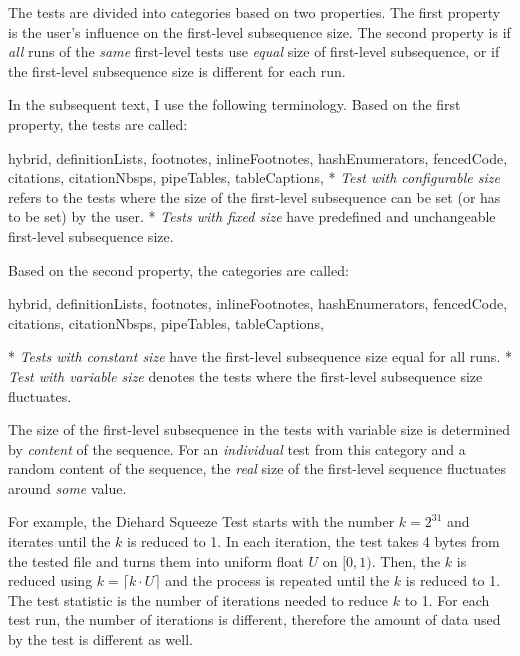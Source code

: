 \documentclass[
  digital,     %
  oneside,     %
  nosansbold,  %
  nocolorbold, %
  nolof,         %
  nolot,         %
]{fithesis4}
\begin{document}
The tests are divided into categories based on two properties. The first property is the user's influence on the first-level subsequence size. The second property is if \emph{all} runs of the \emph{same} first-level tests use \emph{equal} size of first-level subsequence, or if the first-level subsequence size is different for each run. 

In the subsequent text, I use the following terminology. Based on the first property, the tests are called:
\begin{markdown*}{%
  hybrid,
  definitionLists,
  footnotes,
  inlineFootnotes,
  hashEnumerators,
  fencedCode,
  citations,
  citationNbsps,
  pipeTables,
  tableCaptions,
}
* \emph{Test with configurable size} refers to the tests where the size of the first-level subsequence can be set (or has to be set) by the user.
* \emph{Tests with fixed size} have predefined and unchangeable first-level subsequence size.
\end{markdown*}
Based on the second property, the categories are called:
\begin{markdown*}{%
  hybrid,
  definitionLists,
  footnotes,
  inlineFootnotes,
  hashEnumerators,
  fencedCode,
  citations,
  citationNbsps,
  pipeTables,
  tableCaptions,
}

* \emph{Tests with constant size} have the first-level subsequence size equal for all runs.
* \emph{Test with variable size} denotes the tests where the first-level subsequence size fluctuates.

\end{markdown*}

The size of the first-level subsequence in the tests with variable size is determined by \emph{content} of the sequence. For an \emph{individual} test from this category and a random content of the sequence, the \emph{real} size of the first-level sequence fluctuates around \emph{some} value. 

For example, the Diehard Squeeze Test starts with the number $k=2^{31}$ and iterates until the $k$ is reduced to 1. In each iteration, the test takes 4 bytes from the tested file and turns them into uniform float $U$ on $[0,1)$. Then, the $k$ is reduced using $k=\lceil k\cdot U \rceil $ and the process is repeated until the $k$ is reduced to 1. The test statistic is the number of iterations needed to reduce $k$ to 1. For each test run, the number of iterations is different, therefore the amount of data used by the test is different as well.

\end{document}
